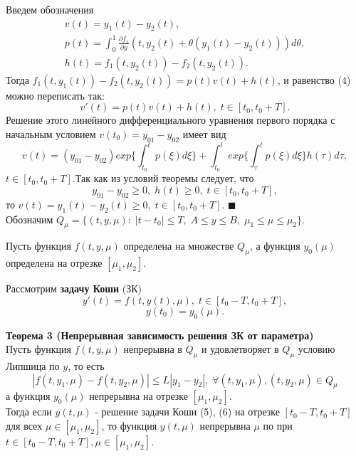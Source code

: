 Введем обозначения
\begin{equation*}
\begin{split}
v(t)=y_1(t)-y_2(t),\\
p(t)= \int_0^1 \frac{\partial f_1}{\partial y}(t,y_2(t)+\theta(y_1(t)-y_2(t)))d\theta,\\
h(t)=f_1(t,y_2(t))-f_2(t,y_2(t)).
\end{split}
\end{equation*}
Тогда $f_1(t,y_1(t))-f_2(t,y_2(t))=p(t)v(t)+h(t)$, и равенство (4) можно переписать так:
\begin{equation*}
v'(t)=p(t)v(t)+h(t),\; t\in[t_0,t_0+T].
\end{equation*}
Решение этого линейного дифференциального уравнения первого порядка с начальным условием $v(t_0)=y_{01}-y_{02}$ имеет вид
\begin{equation*}
v(t)=(y_{01}-y_{02})exp\big\{ \int_{t_0}^t p(\xi)d\xi \big\}+ \int_{t_0}^t exp\big\{\int_{\tau}^t p(\xi)d\xi \big\}h(\tau)d\tau, 
\end{equation*}
$t\in[t_0,t_0+T]$.Так как из условий теоремы следует, что 
\begin{equation*}
y_{01}-y_{02}\geq 0,\; h(t)\geq 0,\; t\in[t_0,t_0+T],
\end{equation*}
то $v(t)=y_1(t)-y_2(t)\geq 0,\; t\in[t_0,t_0+T]$. 
$\blacksquare$\\

Обозначим $Q_\mu=\{(t,y,\mu): \;|t-t_0|\leq T,\; A\leq y\leq B, \;\mu_1\leq \mu\leq \mu_2\}.$

Пусть функция $f(t,y,\mu)$ определена на множестве $Q_\mu$, а функция $y_0(\mu)$ определена на отрезке $[\mu_1,\mu_2]$.

Рассмотрим \textbf{задачу Коши} (ЗК)
\begin{equation*}\tag{5}
y'(t)=f(t,y(t),\mu),\; t\in [t_0-T,t_0+T],
\end{equation*}
\begin{equation*}\tag{6}
y(t_0)=y_0(\mu).
\end{equation*}

\textbf{Теорема 3 (Непрерывная зависимость решения ЗК от параметра)}\\
Пусть функция $f(t,y,\mu)$ непрерывна в $Q_\mu$ и удовлетворяет в $Q_\mu$ условию Липшица по $y$, то есть
\begin{equation*}
|f(t,y_1,\mu)-f(t,y_2,\mu)|\leq L|y_1-y_2|, \;\forall(t,y_1,\mu),(t,y_2,\mu)\in Q_\mu
\end{equation*}
а функция $y_0(\mu)$ непрерывна на отрезке $[\mu_1,\mu_2]$.\\
Тогда если $y(t,\mu)$ - решение задачи Коши (5), (6) на отрезке $[t_0-T,t_0+T]$ для всех $\mu \in [\mu_1,\mu_2]$, то функция $y(t,\mu)$ непрерывна $\mu$ по при $t\in [t_0-T,t_0+T], \mu \in [\mu_1,\mu_2]$.\\

